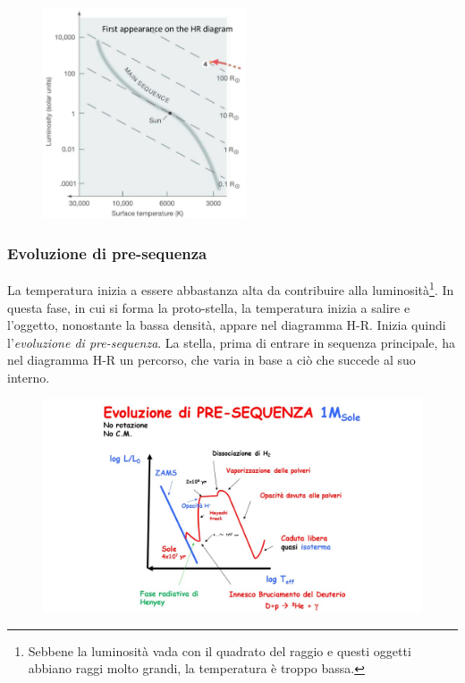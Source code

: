 \begin{figure}[H]
    \centering
    \includegraphics[width=6cm]{lezione 28 novembre/primaapparizionehr.png}
    \label{lezione 28 novembre/primaapparizionehr.png}
\end{figure}

\subsubsection{Evoluzione di pre-sequenza}
La temperatura inizia a essere abbastanza alta da contribuire alla luminosità\footnote{Sebbene la luminosità vada con il quadrato del raggio e questi oggetti abbiano raggi molto grandi, la temperatura è troppo bassa.}. In questa fase, in cui si forma la proto-stella, la temperatura inizia a salire e l'oggetto, nonostante la bassa densità, appare nel diagramma H-R. Inizia quindi l'\textit{evoluzione di pre-sequenza}. La stella, prima di entrare in sequenza principale, ha nel diagramma H-R un percorso, che varia in base a ciò che succede al suo interno.

\begin{figure}[H]
    \centering
    \includegraphics[width=15cm]{lezione 28 novembre/pirronello.jpg}
    \label{lezione 28 novembre/pirronello.jpg}
\end{figure}

